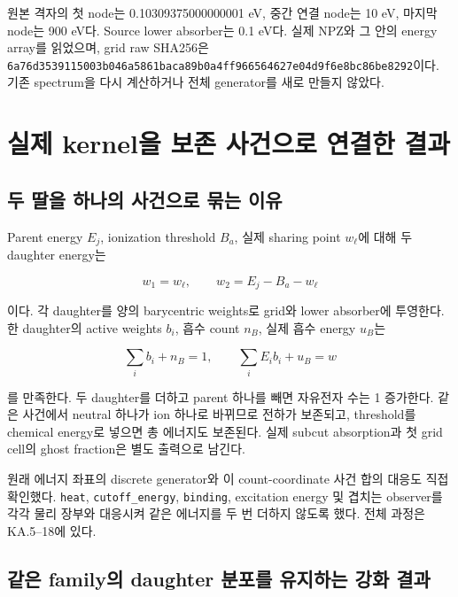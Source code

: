 원본 격자의 첫 node는 0.10309375000000001 eV, 중간 연결 node는 10 eV, 마지막 node는 900 eV다. Source lower absorber는 0.1 eV다. 실제 NPZ와 그 안의 energy array를 읽었으며, grid raw SHA256은 \nolinkurl{6a76d3539115003b046a5861baca89b0a4ff966564627e04d9f6e8bc86be8292}이다. 기존 spectrum을 다시 계산하거나 전체 generator를 새로 만들지 않았다.

\hypertarget{uxc2e4uxc81c-kerneluxc744-uxbcf4uxc874-uxc0acuxac74uxc73cuxb85c-uxc5f0uxacb0uxd55c-uxacb0uxacfc}{%
\section{실제 kernel을 보존 사건으로 연결한 결과}\label{uxc2e4uxc81c-kerneluxc744-uxbcf4uxc874-uxc0acuxac74uxc73cuxb85c-uxc5f0uxacb0uxd55c-uxacb0uxacfc}}

\hypertarget{uxb450-uxb538uxc744-uxd558uxb098uxc758-uxc0acuxac74uxc73cuxb85c-uxbb36uxb294-uxc774uxc720}{%
\subsection{두 딸을 하나의 사건으로 묶는 이유}\label{uxb450-uxb538uxc744-uxd558uxb098uxc758-uxc0acuxac74uxc73cuxb85c-uxbb36uxb294-uxc774uxc720}}

Parent energy \(E_j\), ionization threshold \(B_a\), 실제 sharing point \(w_\ell\)에 대해 두 daughter energy는

\[
w_1=w_\ell,\qquad w_2=E_j-B_a-w_\ell
\]

이다. 각 daughter를 양의 barycentric weights로 grid와 lower absorber에 투영한다. 한 daughter의 active weights \(b_i\), 흡수 count \(n_B\), 실제 흡수 energy \(u_B\)는

\[
\sum_i b_i+n_B=1,\qquad \sum_iE_i b_i+u_B=w
\]

를 만족한다. 두 daughter를 더하고 parent 하나를 빼면 자유전자 수는 1 증가한다. 같은 사건에서 neutral 하나가 ion 하나로 바뀌므로 전하가 보존되고, threshold를 chemical energy로 넣으면 총 에너지도 보존된다. 실제 subcut absorption과 첫 grid cell의 ghost fraction은 별도 출력으로 남긴다.

원래 에너지 좌표의 discrete generator와 이 count-coordinate 사건 합의 대응도 직접 확인했다. \texttt{heat}, \texttt{cutoff\_energy}, \texttt{binding}, excitation energy 및 겹치는 observer를 각각 물리 장부와 대응시켜 같은 에너지를 두 번 더하지 않도록 했다. 전체 과정은 KA.5--18에 있다.

\hypertarget{uxac19uxc740-familyuxc758-daughter-uxbd84uxd3ecuxb97c-uxc720uxc9c0uxd558uxb294-uxac15uxd654-uxacb0uxacfc}{%
\subsection{같은 family의 daughter 분포를 유지하는 강화 결과}\label{uxac19uxc740-familyuxc758-daughter-uxbd84uxd3ecuxb97c-uxc720uxc9c0uxd558uxb294-uxac15uxd654-uxacb0uxacfc}}

